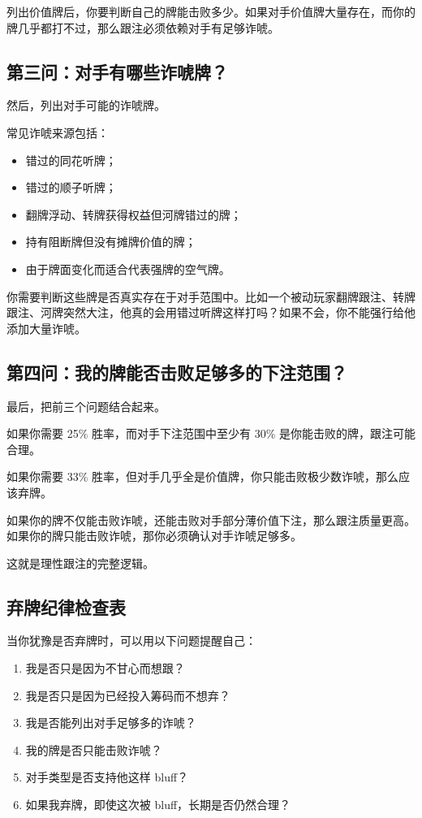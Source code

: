 列出价值牌后，你要判断自己的牌能击败多少。如果对手价值牌大量存在，而你的牌几乎都打不过，那么跟注必须依赖对手有足够诈唬。

\subsection{第三问：对手有哪些诈唬牌？}

然后，列出对手可能的诈唬牌。

常见诈唬来源包括：

\begin{itemize}
\item 错过的同花听牌；
\item 错过的顺子听牌；
\item 翻牌浮动、转牌获得权益但河牌错过的牌；
\item 持有阻断牌但没有摊牌价值的牌；
\item 由于牌面变化而适合代表强牌的空气牌。
\end{itemize}

你需要判断这些牌是否真实存在于对手范围中。比如一个被动玩家翻牌跟注、转牌跟注、河牌突然大注，他真的会用错过听牌这样打吗？如果不会，你不能强行给他添加大量诈唬。

\subsection{第四问：我的牌能否击败足够多的下注范围？}

最后，把前三个问题结合起来。

如果你需要 25\% 胜率，而对手下注范围中至少有 30\% 是你能击败的牌，跟注可能合理。

如果你需要 33\% 胜率，但对手几乎全是价值牌，你只能击败极少数诈唬，那么应该弃牌。

如果你的牌不仅能击败诈唬，还能击败对手部分薄价值下注，那么跟注质量更高。
如果你的牌只能击败诈唬，那你必须确认对手诈唬足够多。

这就是理性跟注的完整逻辑。

\subsection{弃牌纪律检查表}

当你犹豫是否弃牌时，可以用以下问题提醒自己：

\begin{enumerate}
\item 我是否只是因为不甘心而想跟？
\item 我是否只是因为已经投入筹码而不想弃？
\item 我是否能列出对手足够多的诈唬？
\item 我的牌是否只能击败诈唬？
\item 对手类型是否支持他这样 bluff？
\item 如果我弃牌，即使这次被 bluff，长期是否仍然合理？
\end{enumerate}

